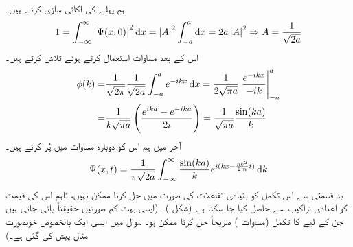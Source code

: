 ہم پہلے  کی اکائی سازی کرتے ہیں۔ 
\begin{align*}
1 = \int_{-\infty}^{\infty} \left| \Psi (x,0) \right| ^{2} \dif x = \left| A \right|^{2} \int_{-a}^{a} \dif x = 2a \left| A \right|^{2} \Rightarrow A = \frac{1}{\sqrt{2a}}
\end{align*}
اس کے بعد مساوات   استعمال کرتے ہوئے  تلاش کرتے ہیں۔
\begin{align*}
\phi(k) =& \frac{1}{\sqrt{2\pi}} \frac{1}{\sqrt{2a}} \int_{-a}^{a} e^{-ikx} \dif x = \frac{1}{2\sqrt{\pi a}} \left. \frac{e^{-ikx}}{-ik} \right|_{-a}^{a} \\
=& \frac{1}{k\sqrt{\pi a}} \left( \frac{e^{ika} - e^{-ika}}{2i} \right) = \frac{1}{\sqrt{\pi a}} \frac{\sin(ka)}{k}
\end{align*}
آخر میں ہم اس کو دوبارہ مساوات  میں پُر کرتے ہیں۔ 
\begin{align}\label{مساوات_غیر_تابع_مستطیل_سے_ارتقا_مشکل_ہے}
\Psi (x,t) = \frac{1}{\pi \sqrt{2a}} \int_{-\infty}^{\infty} \frac{\sin (ka)}{k} e^{i(kx-\frac{\hslash k^{2}}{2m}t)} \dif k
\end{align}
بد قسمتی سے اس تکمل کو بنیادی تفاعلات کی صورت میں حل کرنا ممکن نہیں، تاہم اس کی قیمت کو اعدادی تراکیب سے حاصل کیا جا سکتا ہے (شکل )۔ (ایسی بہت کم صورتیں حقیقتاً پائی جاتی ہیں جن کے لیے  کا 
تکمل (مساوات )  صریحاً حل کرنا ممکن ہو۔ سوال  میں ایسی ایک بالخصوص خوبصورت مثال پیش کی گئی ہے۔)

